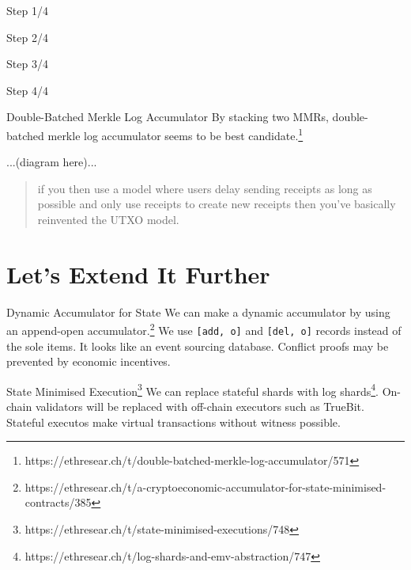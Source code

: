 \documentclass{beamer}
\begin{document}
\begin{frame}{Step 1/4}

\end{frame}

\begin{frame}{Step 2/4}

\end{frame}

\begin{frame}{Step 3/4}

\end{frame}

\begin{frame}{Step 4/4}

\end{frame}

\begin{frame}{Double-Batched Merkle Log Accumulator}
  By stacking two MMRs, double-batched merkle log accumulator seems to be best candidate.\footnote{https://ethresear.ch/t/double-batched-merkle-log-accumulator/571}

  ...(diagram here)...
\end{frame}

\begin{frame}
  \begin{quote}
    if you then use a model where users delay sending receipts as long as possible and only use receipts to create new receipts then you’ve basically reinvented the UTXO model.
  \end{quote}
\end{frame}

\section{Let's Extend It Further}

\begin{frame}{Dynamic Accumulator for State}
  We can make a dynamic accumulator by using an append-open accumulator.\footnote{https://ethresear.ch/t/a-cryptoeconomic-accumulator-for-state-minimised-contracts/385}
  We use \texttt{[add, o]} and \texttt{[del, o]} records instead of the sole items.
  It looks like an event sourcing database.
  Conflict proofs may be prevented by economic incentives.
\end{frame}

\begin{frame}{State Minimised Execution\footnote{https://ethresear.ch/t/state-minimised-executions/748}}
  We can replace stateful shards with log shards\footnote{https://ethresear.ch/t/log-shards-and-emv-abstraction/747}.
  On-chain validators will be replaced with off-chain executors such as TrueBit.
  Stateful executos make virtual transactions without witness possible.
\end{frame}
\end{document}
